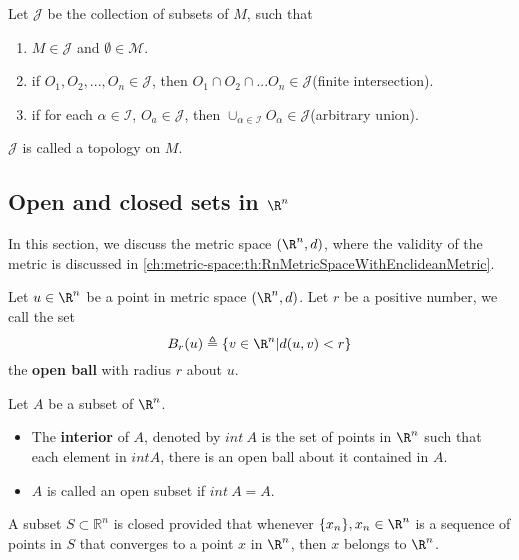 \begin{refsection}
\begin{remark}
	Let $\mathcal{J}$ be the collection of subsets of $M$, such that
	\begin{enumerate}
		\item $M \in \mathcal{J}$ and $\emptyset \in \mathcal{M}$.
		\item if $O_1,O_2,...,O_n \in \mathcal{J}$, then $O_1\cap O_2 \cap ...O_n \in \mathcal{J}$(finite intersection).
		\item if for each $\alpha \in \mathcal{I}$, $O_a \in \mathcal{J}$, then $\cup_{\alpha \in \mathcal{I}} O_{\alpha} \in \mathcal{J}$(arbitrary union).
	\end{enumerate}
	$\mathcal{J}$ is called a topology on $M$.
\end{remark}


\subsection{Open and closed sets in $\R^n$}

\begin{note}
In this section, we discuss the metric space $(\R^n, d)$, where the validity of the metric is discussed in \autoref{ch:metric-space:th:RnMetricSpaceWithEnclideanMetric}.	
\end{note}




\begin{definition}\cite[282]{fitzpatrick2006advanced}
Let  $u\in \R^n$ be a point in metric space $(\R^n, d)$. Let $r$ be a positive number, we call the set
$$B_r(u) \triangleq \{v\in \R^n|d(u,v)<r\}$$
the \textbf{open ball} with radius $r$ about $u$.
\end{definition}

\begin{definition}\cite[282]{fitzpatrick2006advanced}
Let $A$ be a subset of $\R^n$. 
\begin{itemize}
	\item The \textbf{interior} of $A$, denoted by $int~A$ is the set of points in $\R^n$ such that each element in $int A$, there is an open ball about it contained in $A$.
	\item $A$ is called an open subset if $int~A = A$.
\end{itemize}	
\end{definition}



\begin{definition}\cite[284]{fitzpatrick2006advanced}
A subset $S \subset \mathbb{R}^n$ is closed provided that whenever $\{x_n\},x_n\in \R^n$ is a sequence of points in $S$ that converges to a point $x$ in $\R^n$, then $x$ belongs to $\R^n$. 
\end{definition}



\end{refsection}
